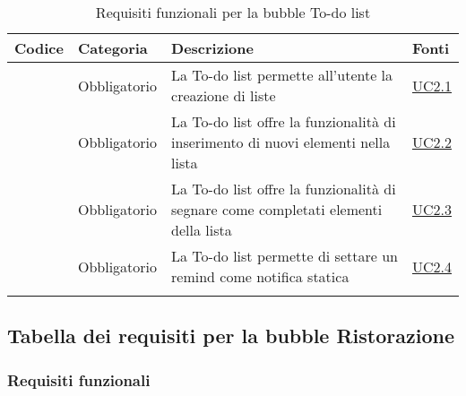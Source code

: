 \begin{longtable}{|P{1.5cm}|P{2.5cm}|P{6.5cm}|P{2.5cm}|}
	\hline \textbf{Codice} & \textbf{Categoria} & \textbf{Descrizione} & \textbf{Fonti} \\
	\hline \RequisitoObF\label{L17} & Obbligatorio & La  To-do list permette all'utente la creazione di liste & \hyperref[UC2.1]{UC2.1} \\
	\hline \RequisitoObF\label{L18} & Obbligatorio & La  To-do list offre la funzionalità di inserimento di nuovi elementi nella lista & \hyperref[UC2.2]{UC2.2} \\
	\hline \RequisitoObF\label{L19} & Obbligatorio & La  To-do list offre la funzionalità di segnare come completati elementi della lista & \hyperref[UC2.3]{UC2.3} \\
	\hline \RequisitoObF\label{L20} & Obbligatorio & La To-do list permette di settare un remind come notifica statica & \hyperref[UC2.4]{UC2.4} \\
	\hline
	\caption{Requisiti funzionali per la bubble To-do list}
\end{longtable}

\subsection{Tabella dei requisiti per la bubble Ristorazione}

\subsubsection{Requisiti funzionali}

